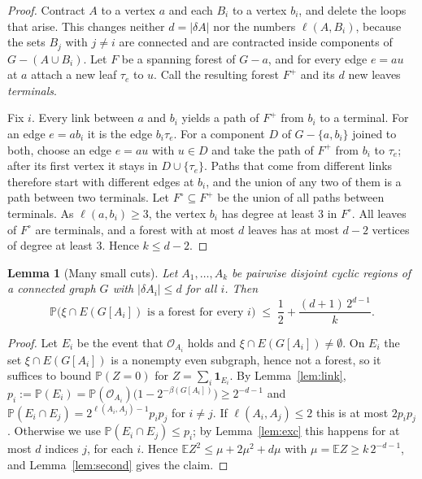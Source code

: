 \documentclass[11pt]{article}
\newtheorem{lemma}[theorem]{Lemma}
\theoremstyle{definition}
\theoremstyle{remark}
\newcommand{\PP}{\mathbb{P}}
\newcommand{\EE}{\mathbb{E}}
\newcommand{\cO}{\mathcal{O}}
\begin{document}
\begin{proof}
Contract $A$ to a vertex $a$ and each $B_i$ to a vertex $b_i$, and delete the loops that arise.
This changes neither $d=|\delta A|$ nor the numbers $\ell(A,B_i)$, because the sets $B_j$ with
$j\ne i$ are connected and are contracted inside components of $G-(A\cup B_i)$. Let $F$ be a spanning forest of
$G-a$, and for every edge $e=au$ at $a$ attach a new leaf $\tau_e$ to $u$. Call the resulting forest
$F^{+}$ and its $d$ new leaves \emph{terminals}.

Fix $i$. Every link between $a$ and $b_i$ yields a path of $F^{+}$ from $b_i$ to a terminal. For an
edge $e=ab_i$ it is the edge $b_i\tau_e$. For a component $D$ of $G-\{a,b_i\}$ joined to both, choose
an edge $e=au$ with $u\in D$ and take the path of $F^{+}$ from $b_i$ to $\tau_e$; after its first
vertex it stays in $D\cup\{\tau_e\}$. Paths that come from different links therefore start with
different edges at $b_i$, and the union of any two of them is a path between two terminals. Let
$F^{\circ}\subseteq F^{+}$ be the union of all paths between terminals. As $\ell(a,b_i)\ge3$, the
vertex $b_i$ has degree at least $3$ in $F^{\circ}$. All leaves of $F^{\circ}$ are terminals, and a
forest with at most $d$ leaves has at most $d-2$ vertices of degree at least $3$. Hence $k\le d-2$.
\end{proof}

\begin{lemma}[Many small cuts]\label{lem:smallcuts}
Let $A_1,\dots,A_k$ be pairwise disjoint cyclic regions of a connected graph $G$ with
$|\delta A_i|\le d$ for all $i$. Then
\[
  \PP\bigl(\xi\cap E(G[A_i])\text{ is a forest for every }i\bigr)\;\le\;\frac12+\frac{(d+1)\,2^{d-1}}{k}.
\]
\end{lemma}

\begin{proof}
Let $E_i$ be the event that $\cO_{A_i}$ holds and $\xi\cap E(G[A_i])\ne\emptyset$. On $E_i$ the set
$\xi\cap E(G[A_i])$ is a nonempty even subgraph, hence not a forest, so it suffices to bound
$\PP(Z=0)$ for $Z=\sum_i\mathbf{1}_{E_i}$. By Lemma~\ref{lem:link},
$p_i:=\PP(E_i)=\PP(\cO_{A_i})\bigl(1-2^{-\beta(G[A_i])}\bigr)\ge2^{-d-1}$ and
$\PP(E_i\cap E_j)=2^{\ell(A_i,A_j)-1}p_ip_j$ for $i\ne j$. If $\ell(A_i,A_j)\le2$ this is at most
$2p_ip_j$. Otherwise we use $\PP(E_i\cap E_j)\le p_i$; by Lemma~\ref{lem:exc} this happens for at
most $d$ indices $j$, for each $i$. Hence $\EE Z^{2}\le\mu+2\mu^{2}+d\mu$ with
$\mu=\EE Z\ge k\,2^{-d-1}$, and Lemma~\ref{lem:second} gives the claim.
\end{proof}
\end{document}
